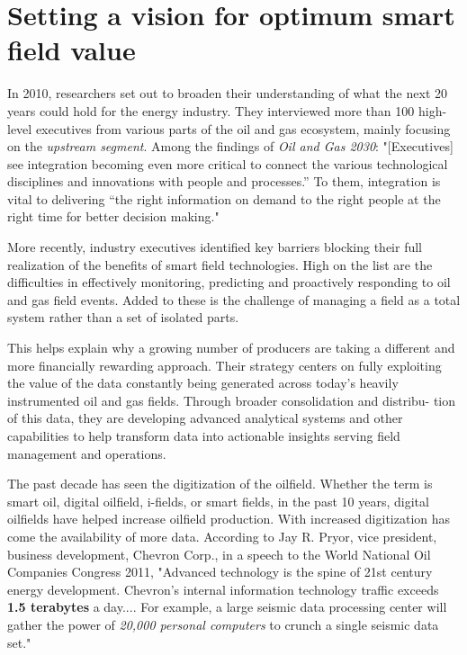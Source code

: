 \documentclass[twocolumn]{article}
\begin{document}
\section{Setting a vision for optimum smart field value}
In 2010, researchers set out to broaden their understanding of what the next 20 years could hold for the energy industry. They interviewed more than 100 high-level executives from various parts of the oil and gas ecosystem, mainly focusing
on the \emph{upstream segment}. Among the findings of \emph{Oil and
Gas 2030}: "[Executives] see integration becoming even more critical to connect the various technological disciplines and innovations with people and processes.” To them, integration is vital to delivering “the right information on demand to the right people at the right time for better decision making."

More recently, industry executives identified key barriers blocking their full realization of the benefits of smart field technologies. High on the list are the difficulties in effectively monitoring, predicting and proactively responding to oil and gas field events. Added to these is the challenge of managing a field as a total system rather than a set of isolated parts.

This helps explain why a growing number of producers are taking a different and more financially rewarding approach. Their strategy centers on fully exploiting the value of the data constantly being generated across today’s heavily instrumented oil and gas fields. Through broader consolidation and distribu- tion of this data, they are developing advanced analytical systems and other capabilities to help transform data into actionable insights serving field management and operations.

The past decade has seen the digitization of the oilfield. Whether the term is smart oil, digital oilfield, i-fields, or smart fields, in the past 10 years, digital oilfields have helped increase oilfield production. With increased digitization has come the availability of more data. According to Jay R. Pryor, vice president, business development, Chevron Corp., in a speech to the World National Oil Companies Congress 2011, "Advanced technology is the spine of 21st century energy development. Chevron's internal information technology traffic exceeds \textbf{1.5 terabytes} a day.... For example, a large seismic data processing center will gather the power of \emph{20,000 personal computers} to crunch a single seismic data set."
\\
\end{document}
